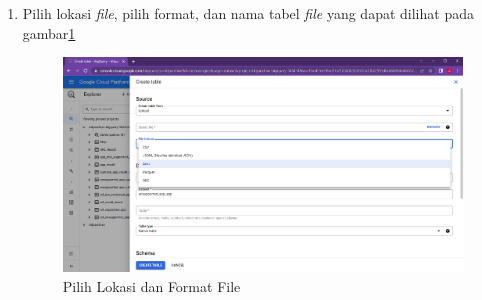 \begin{enumerate}
	\item Pilih lokasi \textit{file}, pilih format, dan nama tabel \textit{file} yang dapat dilihat pada gambar\ref{fig:upload3}
	\begin{figure}[H]
		\centering  
		\includegraphics[scale=0.35]{Gambar/upload_step_3.png}  
		\caption{Pilih Lokasi dan Format File} 
		\label{fig:upload3}
	\end{figure}
\end{enumerate}


